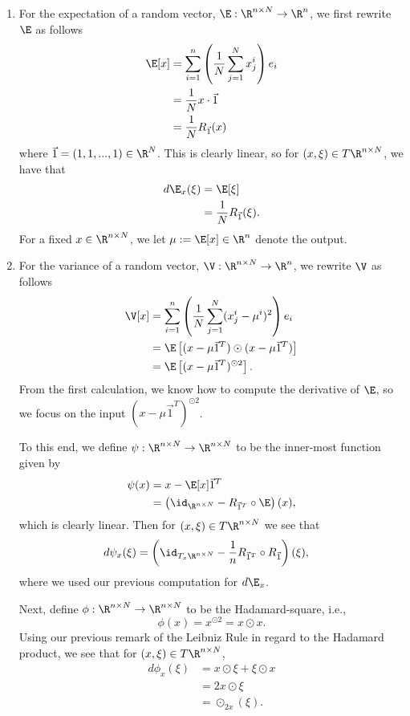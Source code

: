 \begin{enumerate}
	\item For the expectation of a random vector, $\E:\R^{n\times N}\to\R^n$, we first rewrite $\E$ as follows
	\begin{align*}
		\E[x]&=\sum_{i=1}^n\left(\frac{1}{N}\sum_{j=1}^Nx^i_j\right)e_i\\
		&=\frac{1}{N}x\cdot\vec{1}\\
		&=\frac{1}{N}R_{\vec{1}}(x)
	\end{align*}
	where $\vec{1}=(1,1,...,1)\in\R^N$.  This is clearly linear, so for $(x,\xi)\in T\R^{n\times N}$, we have that
	\begin{align*}
		d\E_x(\xi)&=\E[\xi]\\
		&=\frac{1}{N}R_{\vec{1}}(\xi).
	\end{align*}
	For a fixed $x\in\R^{n\times N}$, we let $\mu:=\E[x]\in\R^n$ denote the output.
	
	\item For the variance of a random vector, $\V:\R^{n\times N}\to\R^n$, we rewrite $\V$ as follows
	\begin{align*}
		\V[x]&=\sum_{i=1}^n\left(\frac{1}{N}\sum_{j=1}^N(x^i_j-\mu^i)^2\right)e_i\\
		&=\E\left[(x-\mu\vec{1}^T)\odot(x-\mu\vec{1}^T)\right]\\
		&=\E\left[(x-\mu\vec{1}^T)^{\odot2}\right].
	\end{align*}
	From the first calculation, we know how to compute the derivative of $\E$, so we focus on the input $(x-\mu\vec{1}^T)^{\odot2}$.  
	
	To this end, we define $\psi:\R^{n\times N}\to\R^{n\times N}$ to be the inner-most function given by
	\begin{align*}
		\psi(x)&=x-\E[x]\vec{1}^T\\
		&=\left(\id_{\R^{n\times N}}-R_{\vec{1}^T}\circ\E\right)(x),
	\end{align*}
	which is clearly linear. Then for $(x,\xi)\in T\R^{n\times N}$ we see that
	\begin{align*}
		d\psi_x(\xi)&=\left(\id_{T_x\R^{n\times N}} - \frac{1}{n}R_{\vec{1}^T}\circ R_{\vec{1}}\right)(\xi),
	\end{align*}
	where we used our previous computation for $d\E_x$.
	
	Next, define $\phi:\R^{n\times N}\to\R^{n\times N}$ to be the Hadamard-square, i.e.,
	$$\phi(x)=x^{\odot2}=x\odot x.$$
	  Using our previous remark of the Leibniz Rule in regard to the Hadamard product, we see that for $(x,\xi)\in T\R^{n\times N}$,
	  \begin{align*}
	  	d\phi_x(\xi)&=x\odot\xi+\xi\odot x\\
	  	&=2x\odot\xi\\
	  	&=\odot_{2x}(\xi).
	  \end{align*}
	  

\end{enumerate}
